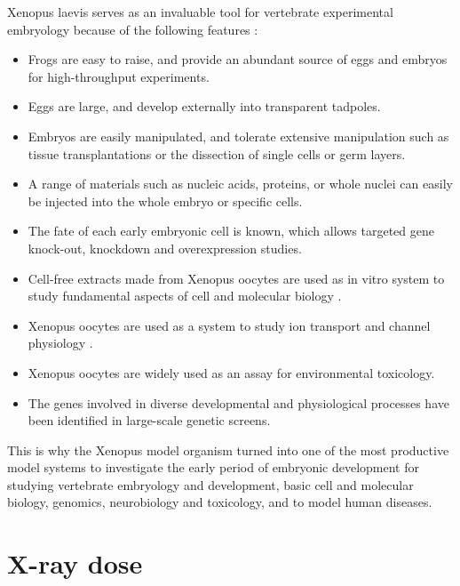 \documentclass[
twoside,
openright,
titlepage,
numbers=noenddot,
headinclude,
fleqn,
a4paper,
footinclude=true,
cleardoublepage=empty,
abstractoff,
BCOR=5mm,
paper=a4,
fontsize=11pt,
british,ngerman,american,
]{scrreprt}
\begin{document}
Xenopus laevis serves as an invaluable tool for vertebrate
experimental embryology because of the following features
\cite{Xenbase,Wallingford2010}:
\begin{itemize}
\item Frogs are easy to raise, and provide an abundant source of eggs
  and embryos for high-throughput experiments.
\item Eggs are large, and develop externally into transparent tadpoles.
\item Embryos are easily manipulated, and tolerate extensive
  manipulation such as tissue transplantations or the dissection of
  single cells or germ layers.
\item A range of materials such as nucleic acids, proteins, or whole
  nuclei can easily be injected into the whole embryo or specific
  cells.
\item The fate of each early embryonic cell is known, which allows
  targeted gene knock-out, knockdown and overexpression studies.
\item Cell-free extracts made from Xenopus oocytes are used as in
  vitro system to study fundamental aspects of cell and molecular
  biology \cite{Wallingford2010}.
\item Xenopus oocytes are used as a system to study ion transport and
  channel physiology \cite{Wallingford2010}.
\item Xenopus oocytes are widely used as an assay for environmental
  toxicology.
\item The genes involved in diverse developmental and physiological
  processes have been identified in large-scale genetic screens.
\end{itemize}
This is why the Xenopus model organism turned into one of the most
productive model systems to investigate the early period of embryonic
development for studying vertebrate embryology and development, basic
cell and molecular biology, genomics, neurobiology and toxicology, and
to model human diseases.


\section{X-ray dose}
\label{sec:bio-dose}
\end{document}
